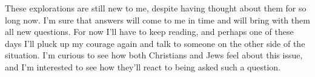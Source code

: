 These explorations are still new to me, despite having thought about them for so long now. I'm sure that answers will come to me in time and will bring with them all new questions. For now I'll have to keep reading, and perhaps one of these days I'll pluck up my courage again and talk to someone on the other side of the situation. I'm curious to see how both Christians and Jews feel about this issue, and I'm interested to see how they'll react to being asked such a question.
